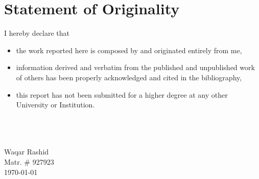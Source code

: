 \documentclass[../main.tex]{subfile}
\begin{document}
\chapter*{\centering Statement of Originality}I hereby declare that
\begin{itemize}
\item the work reported here is composed by and originated entirely from me,
\item information derived and verbatim from the published and unpublished work of others has been properly acknowledged and cited in the bibliography,
\item this report has not been submitted for a higher degree at any other University or Institution.
\end{itemize}

\large
\vspace{20px}
\textbf{}\\
\makebox[1.5in]{\hrulefill}\\
\vspace{5px}\\
Waqar Rashid\\
Matr. \# 927923\\
\today
\end{document}
